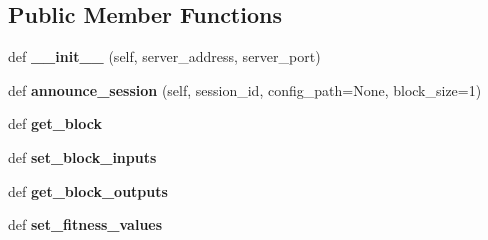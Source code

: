 \subsection*{Public Member Functions}
\begin{DoxyCompactItemize}
\item 
def {\bfseries \+\_\+\+\_\+init\+\_\+\+\_\+} (self, server\+\_\+address, server\+\_\+port)\hypertarget{class_n_e_a_t___py_genetics_1_1_n_e_a_t_1_1_networking_1_1_client_1_1_simulation_client_1_1_simulation_client_a1c778ac890847ec7cf4f2dedab962ce9}{}\label{class_n_e_a_t___py_genetics_1_1_n_e_a_t_1_1_networking_1_1_client_1_1_simulation_client_1_1_simulation_client_a1c778ac890847ec7cf4f2dedab962ce9}

\item 
def {\bfseries announce\+\_\+session} (self, session\+\_\+id, config\+\_\+path=None, block\+\_\+size=1)\hypertarget{class_n_e_a_t___py_genetics_1_1_n_e_a_t_1_1_networking_1_1_client_1_1_simulation_client_1_1_simulation_client_a32f0a2edf3339e2d874bca161516ac18}{}\label{class_n_e_a_t___py_genetics_1_1_n_e_a_t_1_1_networking_1_1_client_1_1_simulation_client_1_1_simulation_client_a32f0a2edf3339e2d874bca161516ac18}

\item 
def {\bfseries get\+\_\+block}\hypertarget{class_n_e_a_t___py_genetics_1_1_n_e_a_t_1_1_networking_1_1_client_1_1_simulation_client_1_1_simulation_client_ad77ac994b568f19bb7468ebff9332cbc}{}\label{class_n_e_a_t___py_genetics_1_1_n_e_a_t_1_1_networking_1_1_client_1_1_simulation_client_1_1_simulation_client_ad77ac994b568f19bb7468ebff9332cbc}

\item 
def {\bfseries set\+\_\+block\+\_\+inputs}\hypertarget{class_n_e_a_t___py_genetics_1_1_n_e_a_t_1_1_networking_1_1_client_1_1_simulation_client_1_1_simulation_client_a6cb78ce85e0d06b14c4da1235ca554b0}{}\label{class_n_e_a_t___py_genetics_1_1_n_e_a_t_1_1_networking_1_1_client_1_1_simulation_client_1_1_simulation_client_a6cb78ce85e0d06b14c4da1235ca554b0}

\item 
def {\bfseries get\+\_\+block\+\_\+outputs}\hypertarget{class_n_e_a_t___py_genetics_1_1_n_e_a_t_1_1_networking_1_1_client_1_1_simulation_client_1_1_simulation_client_a9d5c043ac1439872cfcbb767e751d586}{}\label{class_n_e_a_t___py_genetics_1_1_n_e_a_t_1_1_networking_1_1_client_1_1_simulation_client_1_1_simulation_client_a9d5c043ac1439872cfcbb767e751d586}

\item 
def {\bfseries set\+\_\+fitness\+\_\+values}\hypertarget{class_n_e_a_t___py_genetics_1_1_n_e_a_t_1_1_networking_1_1_client_1_1_simulation_client_1_1_simulation_client_a30dca9ecfedc51b314579100f8fa21d4}{}\label{class_n_e_a_t___py_genetics_1_1_n_e_a_t_1_1_networking_1_1_client_1_1_simulation_client_1_1_simulation_client_a30dca9ecfedc51b314579100f8fa21d4}


\end{DoxyCompactItemize}

